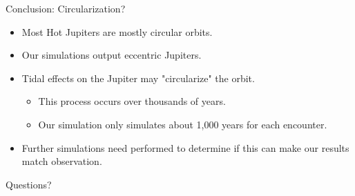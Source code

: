 \documentclass{beamer}
\begin{document}
\begin{frame}{Conclusion: Circularization?}
    \begin{itemize}
        \item Most Hot Jupiters are mostly circular orbits.
        \item Our simulations output eccentric Jupiters.
        \item Tidal effects on the Jupiter may "circularize" the orbit.
        \begin{itemize}
            \item This process occurs over thousands of years.
            \item Our simulation only simulates about 1,000 years for each encounter.
        \end{itemize}
        \item Further simulations need performed to determine if this can make our results
            match observation.
    \end{itemize}
\end{frame}

\begin{frame}
    \Huge
    \begin{centering}
        Questions?
    \end{centering}
\end{frame}
\end{document}
